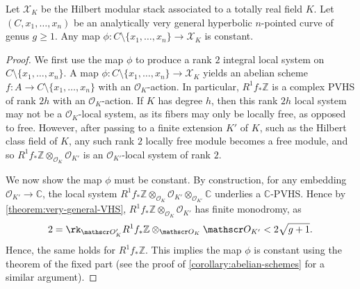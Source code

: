 \begin{proposition}
\notready
	\label{proposition:hilbert-modular}
	Let $\mathscr X_K$ be the Hilbert modular stack associated to a totally
	real field $K$.
	Let $(C, x_1, \ldots, x_n)$ be an analytically very general hyperbolic $n$-pointed
	curve of genus $g \geq 1$.
	Any map $\phi: C\setminus \{x_1, \ldots, x_n\} \to \mathscr X_K$ is constant.
\end{proposition}
\begin{proof}
	We first use the map $\phi$ to produce a rank $2$ integral local system
	on $C \setminus \{x_1, \ldots, x_n\}$.
	A map $\phi: C\setminus \{x_1, \ldots, x_n\} \to \mathscr X_K$ yields an
	abelian scheme $f: A \to C\setminus \{x_1, \ldots, x_n\}$ with an $\mathscr
	O_K$-action. In particular, $R^1 f_* \mathbb Z$ is a
	complex PVHS of rank $2h$ with an	$\mathscr O_K$-action.
	If $K$ has degree $h$, then this rank $2h$ local system may not be a
	$\mathscr O_K$-local system, as its fibers may only be locally free, as opposed to free.
	However, after passing to a finite extension $K'$ of $K$, such as the
	Hilbert class field of $K$, any such rank $2$ locally free module
	becomes a free module,
	and so $R^1 f_* \mathbb Z
	\otimes_{\mathscr O_K} \mathscr O_{K'}$ is an $\mathscr O_{K'}$-local system of rank $2$.

	We now show the map $\phi$ must be constant.
	By construction,
	for any embedding $\mathscr O_{K'} \to \mathbb C$, the local system
$R^1 f_* \mathbb Z\otimes_{\mathscr O_K} \mathscr O_{K'} \otimes_{\mathscr
O_{K'}} \mathbb C$ underlies a $\mathbb{C}$-PVHS. Hence by \autoref{theorem:very-general-VHS}, $R^1 f_* \mathbb Z\otimes_{\mathscr O_K} \mathscr O_{K'}$ has finite monodromy, as
\begin{align*}
2 = \rk_{\mathscr O_K'}R^1 f_* \mathbb Z\otimes_{\mathscr O_K} \mathscr O_{K'} < 2 \sqrt{g+1}.
\end{align*}
Hence, the same holds for
$R^1 f_* \mathbb Z$.
This implies the map $\phi$ is constant using the theorem of the fixed part
\cite[Corollaire 4.1.2]{deligne:hodge-ii} (see the proof
of \autoref{corollary:abelian-schemes} for a similar argument).
\end{proof}

